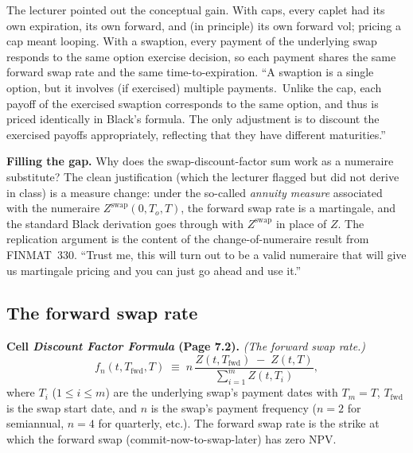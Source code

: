 The lecturer pointed out the conceptual gain. With caps, every
caplet had its own expiration, its own forward, and (in principle)
its own forward vol; pricing a cap meant looping. With a swaption,
every payment of the underlying swap responds to the same option
exercise decision, so each payment shares the same forward swap rate
and the same time-to-expiration. ``A swaption is a single option,
but it involves (if exercised) multiple payments.\ Unlike the cap,
each payoff of the exercised swaption corresponds to the same
option, and thus is priced identically in Black's formula. The only
adjustment is to discount the exercised payoffs appropriately,
reflecting that they have different maturities.''

\begin{tipblock}
\textbf{Filling the gap.} Why does the swap-discount-factor sum work
as a numeraire substitute? The clean justification (which the
lecturer flagged but did not derive in class) is a measure change:
under the so-called \emph{annuity measure} associated with the
numeraire $Z^{\text{swap}}(0, T_o, T)$, the forward swap rate is a
martingale, and the standard Black derivation goes through with
$Z^{\text{swap}}$ in place of $Z$. The replication argument is the
content of the change-of-numeraire result from FINMAT~330. ``Trust
me, this will turn out to be a valid numeraire that will give us
martingale pricing and you can just go ahead and use it.''
\end{tipblock}

\subsection{The forward swap rate}\label{L6-sec:fwd-swap-rate}

\begin{keyblock}
\textbf{Cell \emph{Discount Factor Formula} (Page 7.2).}
\emph{(The forward swap rate.)}
\[
  f_n(t, T_{\text{fwd}}, T) \;\equiv\; n\,
        \frac{Z(t, T_{\text{fwd}}) \;-\; Z(t, T)}{\sum_{i = 1}^{m} Z(t, T_i)},
\]
where $T_i$ ($1 \le i \le m$) are the underlying swap's payment
dates with $T_m = T$, $T_{\text{fwd}}$ is the swap start date, and
$n$ is the swap's payment frequency ($n = 2$ for semiannual,
$n = 4$ for quarterly, etc.).
The forward swap rate is the strike at which the forward swap
(commit-now-to-swap-later) has zero NPV.
\end{keyblock}


